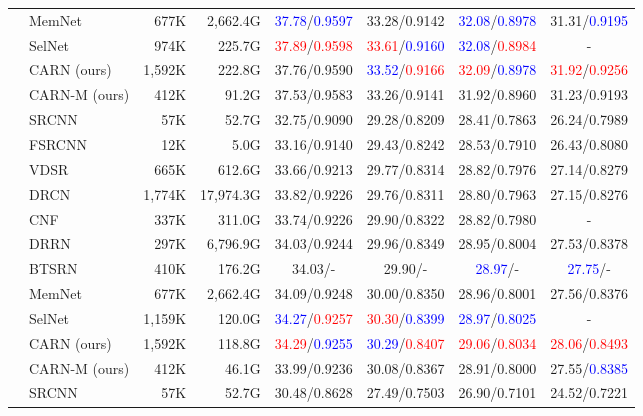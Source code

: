 \documentclass[runningheads]{llncs}
\newcommand{\blue}[1]{\textcolor{blue}{#1}}
\newcommand{\red}[1]{\textcolor{red}{#1}}
\newcommand\Tstrut{\rule{0pt}{2.5ex}}
\newcommand\Bstrut{\rule[-1ex]{0pt}{0pt}}
\def\HS{\hspace{\fontdimen2\font}}
\def\HSE{\HS\HS\HS\HS\HS\HS\HS\HS}
\begin{document}
\begin{table}[t]
\begin{center}
\begin{tabular}{c l r r c c c c}
& MemNet\cite{memnet}      & 677K   & 2,662.4G   & \blue{37.78}/\blue{0.9597} & 33.28/0.9142 & \blue{32.08}/\blue{0.8978} & 31.31/\blue{0.9195} \\
& SelNet\cite{selnet}      & 974K   & 225.7G   & \red{37.89}/\red{0.9598}  & \red{33.61}/\blue{0.9160}  & \blue{32.08}/\red{0.8984} & - \\
& CARN (ours)              & 1,592K & 222.8G   & 37.76/0.9590 & \blue{33.52}/\red{0.9166} & \red{32.09}/\blue{0.8978}	& \red{31.92}/\red{0.9256} \\
& CARN-M (ours)            & 412K   & 91.2G    & 37.53/0.9583 & 33.26/0.9141 & 31.92/0.8960	& 31.23/0.9193\Bstrut \\\hline\Tstrut
\multirow{11}{*}{3} & SRCNN\cite{srcnn2014}
                           & 57K    & 52.7G    & 32.75/0.9090 & 29.28/0.8209 & 28.41/0.7863 & 26.24/0.7989 \\
& FSRCNN\cite{fsrcnn2016}  & 12K    & 5.0G     & 33.16/0.9140 & 29.43/0.8242 & 28.53/0.7910 & 26.43/0.8080 \\
& VDSR\cite{vdsr2016}      & 665K   & 612.6G   & 33.66/0.9213 & 29.77/0.8314 & 28.82/0.7976 & 27.14/0.8279 \\
& DRCN\cite{drcn2016}      & 1,774K & 17,974.3G & 33.82/0.9226 & 29.76/0.8311 & 28.80/0.7963 & 27.15/0.8276 \\
& CNF\cite{cnf2017}        & 337K   & 311.0G   & 33.74/0.9226 & 29.90/0.8322 & 28.82/0.7980 & -\\
& DRRN\cite{drnn2017}      & 297K   & 6,796.9G & 34.03/0.9244 & 29.96/0.8349 & 28.95/0.8004 & 27.53/0.8378 \\
& BTSRN\cite{btsrn2017}    & 410K   & 176.2G   & 34.03/-\HSE  & 29.90/-\HSE  & \blue{28.97}/-\HSE & \blue{27.75}/-\HSE \\
& MemNet\cite{memnet}      & 677K   & 2,662.4G   & 34.09/0.9248 & 30.00/0.8350 & 28.96/0.8001 & 27.56/0.8376 \\
& SelNet\cite{selnet}      & 1,159K & 120.0G   & \blue{34.27}/\red{0.9257}  & \red{30.30}/\blue{0.8399}  & \blue{28.97}/\blue{0.8025} & - \\
& CARN (ours)              & 1,592K & 118.8G   & \red{34.29}/\blue{0.9255} & \blue{30.29}/\red{0.8407} & \red{29.06}/\red{0.8034}	& \red{28.06}/\red{0.8493} \\
& CARN-M (ours)            & 412K   & 46.1G    & 33.99/0.9236 & 30.08/0.8367 & 28.91/0.8000	& 27.55/\blue{0.8385}\Bstrut \\\hline\Tstrut
\multirow{13}{*}{4} &SRCNN\cite{srcnn2014}
                           & 57K    & 52.7G    & 30.48/0.8628 & 27.49/0.7503 & 26.90/0.7101 & 24.52/0.7221 \\

\end{tabular}
\end{center}
\end{table}
\end{document}
